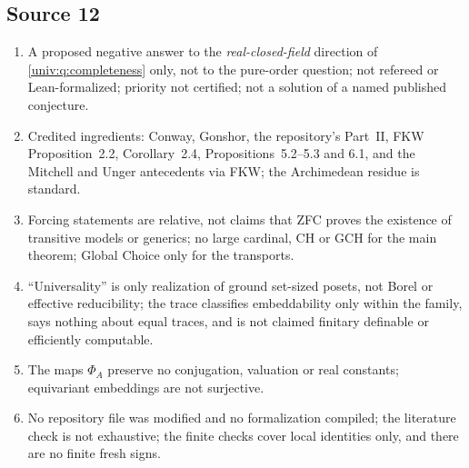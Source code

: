 \documentclass[11pt,letterpaper]{article}
\numberwithin{equation}{section}
\theoremstyle{definition}
\theoremstyle{remark}
\begin{document}
\subsection*{Source 12}
\begin{enumerate}[label=12.\arabic*,leftmargin=3.2em]
\item A proposed negative answer to the \emph{real-closed-field} direction of
\cref{univ:q:completeness} only, not to the pure-order question; not refereed or Lean-formalized;
priority not certified; not a solution of a named published conjecture.
\item Credited ingredients: Conway, Gonshor, the repository's Part~II, FKW Proposition~2.2,
Corollary~2.4, Propositions~5.2--5.3 and 6.1, and the Mitchell and Unger antecedents via FKW; the
Archimedean residue is standard.
\item Forcing statements are relative, not claims that ZFC proves the existence of transitive models or
generics; no large cardinal, CH or GCH for the main theorem; Global Choice only for the transports.
\item ``Universality'' is only realization of ground set-sized posets, not Borel or effective
reducibility; the trace classifies embeddability only within the family, says nothing about equal
traces, and is not claimed finitary definable or efficiently computable.
\item The maps $\Phi_A$ preserve no conjugation, valuation or real constants; equivariant embeddings are
not surjective.
\item No repository file was modified and no formalization compiled; the literature check is not
exhaustive; the finite checks cover local identities only, and there are no finite fresh signs.
\end{enumerate}
\end{document}
